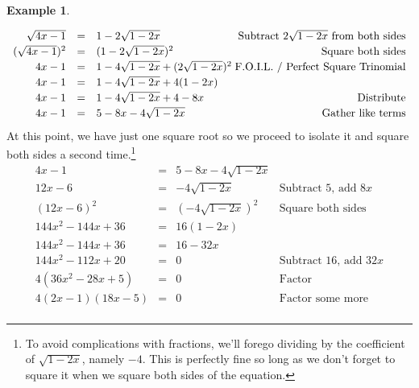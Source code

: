 \documentclass[11pt]{article}
\theoremstyle{definition}  %
\newtheorem{ex}{\bf Example}
\begin{document}
\begin{ex}
\begin{enumerate}
\[\begin{array}{rclr}
\sqrt{4x-1} & = & 1 - 2\sqrt{1-2x} & \hspace*{-.1in} \text{Subtract $2\sqrt{1 - 2x}$ from both sides} \\[2pt]

(\sqrt{4x-1})^2 & = & (1 - 2\sqrt{1-2x})^2 & \text{Square both sides} \\[2pt]

4x - 1 & = & 1 - 4\sqrt{1-2x} + (2\sqrt{1-2x})^2 & \hspace*{-.1in} \text{F.O.I.L. / Perfect Square Trinomial} \\[2pt]

4x - 1 & = & 1 - 4\sqrt{1-2x} + 4(1-2x) & \\[2pt]

4x - 1 & = & 1 - 4\sqrt{1-2x} + 4 - 8x & \text{Distribute} \\ [2pt]

4x - 1 & = & 5 - 8x - 4\sqrt{1-2x} & \text{Gather like terms} \\ \end{array} \] At this point, we have just one square root so we proceed to isolate it and square both sides a second time.\footnote{To avoid complications with fractions, we'll forego dividing by the coefficient of $\sqrt{1-2x}$, namely $-4$. This is perfectly fine so long as we don't forget to square it when we square both sides of the equation.} \[ \begin{array}{rclr}

4x - 1 & = & 5 - 8x - 4\sqrt{1-2x} &  \\ [2pt]

12x - 6 & = & -4\sqrt{1-2x} & \text{Subtract $5$, add $8x$}\\ [2pt]

(12x-6)^2 & = & (-4\sqrt{1-2x})^2 & \text{Square both sides} \\[2pt]

144x^2 - 144x + 36 & = & 16(1-2x) & \\ [2pt]

144x^2 -  144x + 36 & = & 16 - 32x & \\[2pt]

144x^2 - 112x + 20 & = & 0 & \text{Subtract $16$, add $32x$} \\[2pt]

4(36x^2 - 28x + 5) & = & 0 & \text{Factor} \\[2pt]

4(2x-1)(18x - 5) & = & 0 & \text{Factor some more} \\


\end{array}\]
\end{enumerate}
\end{ex}
\end{document}
